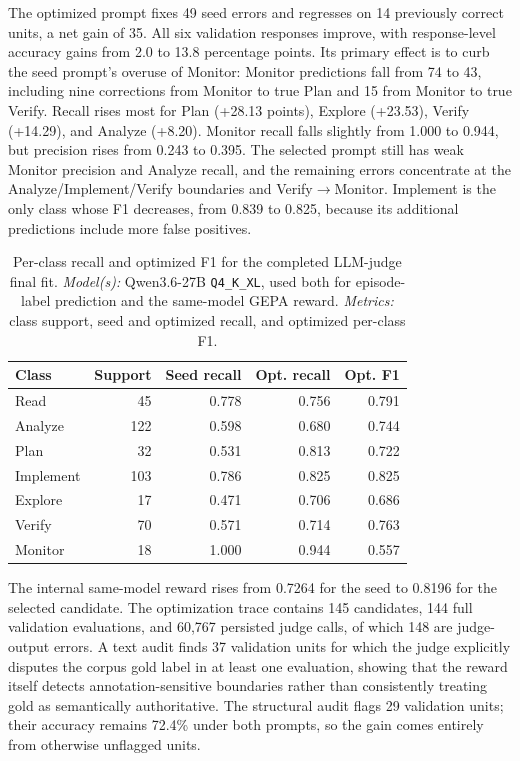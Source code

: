 \documentclass[manuscript,screen,review]{jair}
\newcommand{\modelmetrics}[2]{\textit{Model(s):} #1. \textit{Metrics:} #2.}
\begin{document}
The optimized prompt fixes 49 seed errors and regresses on 14 previously
correct units, a net gain of 35.  All six validation responses improve, with
response-level accuracy gains from 2.0 to 13.8 percentage points.  Its primary
effect is to curb the seed prompt's overuse of Monitor: Monitor predictions
fall from 74 to 43, including nine corrections from Monitor to true Plan and
15 from Monitor to true Verify.  Recall rises most for Plan (+28.13 points),
Explore (+23.53), Verify (+14.29), and Analyze (+8.20).  Monitor recall falls
slightly from 1.000 to 0.944, but precision rises from 0.243 to 0.395.  The
selected prompt still has weak Monitor precision and Analyze recall, and the
remaining errors concentrate at the Analyze/Implement/Verify boundaries and
Verify$\rightarrow$Monitor.  Implement is the only class whose F1 decreases,
from 0.839 to 0.825, because its additional predictions include more false
positives.

\begin{table}[t]
\centering
\caption{Per-class recall and optimized F1 for the completed LLM-judge final
fit.  \modelmetrics{Qwen3.6-27B \texttt{Q4\_K\_XL}, used both for
episode-label prediction and the same-model GEPA reward}{class support, seed
and optimized recall, and optimized per-class F1}}
\label{tab:exp0a-llmjudge-classes}
\begin{tabular}{lrrrr}
\toprule
Class & Support & Seed recall & Opt. recall & Opt. F1 \\
\midrule
Read      &  45 & 0.778 & 0.756 & 0.791 \\
Analyze   & 122 & 0.598 & 0.680 & 0.744 \\
Plan      &  32 & 0.531 & 0.813 & 0.722 \\
Implement & 103 & 0.786 & 0.825 & 0.825 \\
Explore   &  17 & 0.471 & 0.706 & 0.686 \\
Verify    &  70 & 0.571 & 0.714 & 0.763 \\
Monitor   &  18 & 1.000 & 0.944 & 0.557 \\
\bottomrule
\end{tabular}
\end{table}

The internal same-model reward rises from 0.7264 for the seed to 0.8196 for
the selected candidate.  The optimization trace contains 145 candidates, 144
full validation evaluations, and 60,767 persisted judge calls, of which 148
are judge-output errors.  A text audit finds 37 validation units for which the
judge explicitly disputes the corpus gold label in at least one evaluation,
showing that the reward itself detects annotation-sensitive boundaries rather
than consistently treating gold as semantically authoritative.  The structural
audit flags 29 validation units; their accuracy remains 72.4\% under both
prompts, so the gain comes entirely from otherwise unflagged units.
\end{document}
